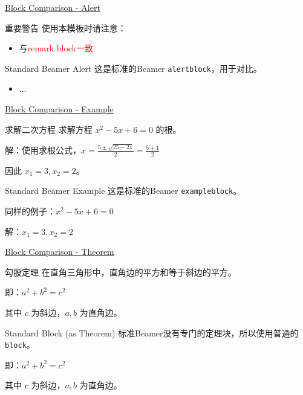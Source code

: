 \documentclass[11pt,aspectratio=43,xcolor={dvipsnames},hyperref={pdftex,pdfpagemode=UseNone,hidelinks,pdfdisplaydoctitle=true},usepdftitle=false]{ctexbeamer}
\begin{document}
\begin{frame}{\underline{Block Comparison - Alert}}
  \begin{chdalert}{重要警告}
    使用本模板时请注意：
    \begin{itemize}
      \item 与\textcolor{red}{remark block一致}
    \end{itemize}
  \end{chdalert}
  
  \vspace{0.3cm}
  
  \begin{alertblock}{Standard Beamer Alert}
    这是标准的Beamer \texttt{alertblock}，用于对比。
    \begin{itemize}
      \item $\dots$
    \end{itemize}
  \end{alertblock}
\end{frame}


\begin{frame}{\underline{Block Comparison - Example}}
  \begin{chdexample}{求解二次方程}
    求解方程 $x^2 - 5x + 6 = 0$ 的根。
    
    解：使用求根公式，$x = \frac{5 \pm \sqrt{25-24}}{2} = \frac{5 \pm 1}{2}$
    
    因此 $x_1 = 3, x_2 = 2$。
  \end{chdexample}
  
  \vspace{0.3cm}
  
  \begin{exampleblock}{Standard Beamer Example}
    这是标准的Beamer \texttt{exampleblock}。
    
    同样的例子：$x^2 - 5x + 6 = 0$
    
    解：$x_1 = 3, x_2 = 2$
  \end{exampleblock}
\end{frame}

\begin{frame}{\underline{Block Comparison - Theorem}}
  \begin{chdtheorem}{勾股定理}
    在直角三角形中，直角边的平方和等于斜边的平方。
    
    即：$a^2 + b^2 = c^2$
    
    其中 $c$ 为斜边，$a, b$ 为直角边。
  \end{chdtheorem}
  
  \vspace{0.3cm}
  
  \begin{block}{Standard Block (as Theorem)}
    标准Beamer没有专门的定理块，所以使用普通的\texttt{block}。
    
    即：$a^2 + b^2 = c^2$
    
    其中 $c$ 为斜边，$a, b$ 为直角边。
  \end{block}
\end{frame}
\end{document}
